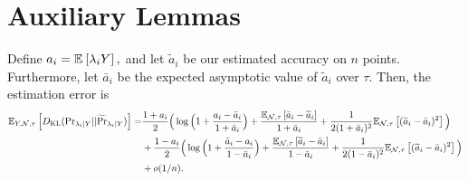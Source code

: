 \section{Auxiliary Lemmas}


\begin{lemma}
Define $a_i = \mathbb{E}_{}\left[\lambda_i Y\right],$ and let $\widetilde{a}_i$ be our estimated accuracy on $n$ points. Furthermore, let $\bar{a}_i$ be the expected asymptotic value of $\widetilde{a}_i$ over $\tau$.   %
Then, the estimation error is
\begin{align*}
\mathbb{E}_{Y, \mathcal{N}, \tau}\left[D_{\mathrm{KL}} (\mathrm{Pr}_{\lambda_i | Y} || \widetilde{\Pr}_{\lambda_i | Y} )\right] = &\frac{1 + a_i}{2} \Big(\log\Big(1 + \frac{a_i - \bar{a}_i }{1 + \bar{a}_i}\Big) + \frac{\mathbb{E}_{\mathcal{N}, \tau}\left[\bar{a}_i - \widetilde{a}_i\right]}{1 + \bar{a}_i} + \frac{1}{2(1 + \bar{a}_i)^2} \mathbb{E}_{\mathcal{N}, \tau}\left[(\widetilde{a}_i - \bar{a}_i)^2\right]\Big) \\
&+  \frac{1 - a_i}{2}\Big(\log\Big(1 + \frac{\bar{a}_i - a_i}{1 - \bar{a}_i} \Big) +   \frac{\mathbb{E}_{\mathcal{N}, \tau}\left[\widetilde{a}_i - \bar{a}_i\right]}{1 - \bar{a}_i} + \frac{1}{2(1 - \bar{a}_i)^2} \mathbb{E}_{\mathcal{N}, \tau}\left[(\widetilde{a}_i - \bar{a}_i)^2\right]\Big) \\
&+ o(1/n).
\end{align*}
\label{lemma:KL_estimation}
\end{lemma}

